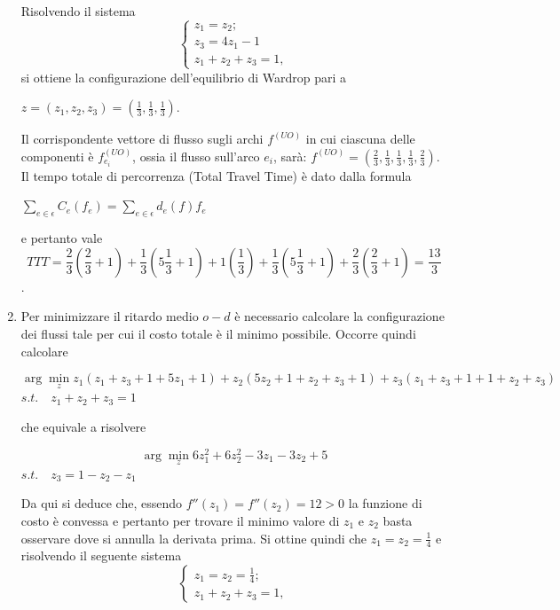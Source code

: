 \documentclass[13pt,largemargins]{homework}
\newcommand{\argmin}{\arg\!\min}
\begin{document}
\begin{enumerate}[label=(\alph*)]
Risolvendo il sistema 
\begin{equation}
	\begin{cases}
		z_1 = z_2; \\
		z_3 =4z_1-1 \\
		z_1+z_2+z_3=1,
	\end{cases}
\end{equation}	
si ottiene la configurazione dell'equilibrio di Wardrop pari a \begin{center}
$z=(z_1, z_2, z_3)=(\frac{1}{3}, \frac{1}{3}, \frac{1}{3})$. 
\end{center} 
Il corrispondente vettore di flusso sugli archi $f^{(UO)}$ in cui ciascuna delle componenti è $f^{(UO)}_{e_i}$, ossia il flusso sull'arco $e_i$, sarà: $f^{(UO)}=(\frac{2}{3}, \frac{1}{3}, \frac{1}{3}, \frac{1}{3}, \frac{2}{3})$.\\

Il tempo totale di percorrenza (Total Travel Time) è dato dalla formula
\begin{center}
$\sum_{e \in \epsilon} C_e(f_e) =  \sum_{e \in \epsilon} d_e(f)f_e$
\end{center} e pertanto vale \[TTT=\frac{2}{3}(\frac{2}{3}+1) + \frac{1}{3}(5\frac{1}{3}+1) + 1(\frac{1}{3}) + \frac{1}{3}(5\frac{1}{3}+1) + \frac{2}{3}(\frac{2}{3}+1) =\frac{13}{3}\]. 
\item %
Per minimizzare il ritardo medio \(o - d\) è necessario calcolare la configurazione dei flussi tale per cui il costo totale è il minimo possibile. Occorre quindi calcolare 
\begin{center}
\[ \argmin_z z_1(z_1 + z_3 + 1 + 5z_1 + 1) + z_2(5z_2+1+z_2+z_3+1) + z_3(z_1+z_3+1+1+z_2+z_3)\] 
$s.t. \quad z_1+z_2+z_3 = 1$
\end{center} 
che equivale a risolvere 
\begin{center}
\[\argmin_z 6z_1^2 + 6z_2^2 - 3z_1 -3z_2 + 5 \]
$s.t. \quad z_3 = 1-z_2 - z_1$
\end{center} 
Da qui si deduce che, essendo $f''(z_1) = f''(z_2) = 12 > 0$  la funzione di costo è convessa e pertanto per trovare il minimo valore di $z_1$ e $z_2$ basta osservare dove si annulla la derivata prima. Si ottine quindi che $z_1 = z_2 = \frac{1}{4}$ e risolvendo il seguente sistema 
\begin{equation}
\begin{cases}
		z_1 = z_2 = \frac{1}{4}; \\
		z_1+z_2+z_3=1,
\end{cases}
\end{equation}


\end{enumerate}
\end{document}
